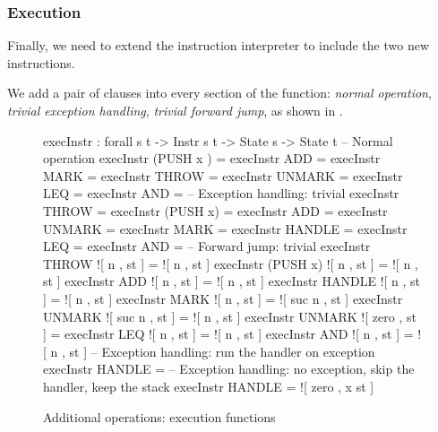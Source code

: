 \subsubsection{Execution}

Finally, we need to extend the instruction interpreter to include the two new
instructions.

We add a pair of clauses into every section of the function: \emph{normal
operation}, \emph{trivial exception handling}, \emph{trivial forward jump},
as shown in .

\begin{figure}
\begin{codei}
  execInstr : forall {s t} -> Instr s t -> State s -> State t
  -- Normal operation
  execInstr (PUSH  x ) \tick[         	st ] = \tick[ x \scons st ]
  execInstr  ADD        = \tick[ (x + y) \scons st ]
  execInstr  MARK      \tick[          	st ] = 
  execInstr  THROW     \tick[          	st ] = 
  execInstr  UNMARK     = \tick[ x \scons st ]
  execInstr  LEQ        = 
  execInstr  AND        = 
  -- Exception handling: trivial
  execInstr  THROW		\x[     n , st ] = \x[     n , st ]
  execInstr (PUSH x)	\x[     n , st ] = \x[     n , st ]
  execInstr  ADD		\x[     n , st ] = \x[     n , st ]
  execInstr  UNMARK		\x[     n , st ] = \x[     n , st ]
  execInstr  MARK		\x[     n , st ] = \x[ suc n , st ]
  execInstr  HANDLE		\x[ suc n , st ] = \x[     n , st ]
  execInstr  LEQ		\x[     n , st ] = \x[     n , st ]
  execInstr  AND		\x[     n , st ] = \x[     n , st ]
  -- Forward jump: trivial
  execInstr  THROW		![ n , st ] = ![ n , st ]
  execInstr (PUSH x)	![ n , st ] = ![ n , st ]
  execInstr  ADD		![ n , st ] = ![ n , st ]
  execInstr  HANDLE		![ n , st ] = ![ n , st ]
  execInstr  MARK		![     n , st ] = ![ suc n , st ]
  execInstr  UNMARK		![ suc n , st ] = ![     n , st ]
  execInstr  UNMARK		![ zero  , st ] = \tick[ st ]
  execInstr  LEQ		![ n , st ] = ![ n , st ]
  execInstr  AND		![ n , st ] = ![ n , st ]
  -- Exception handling: run the handler on exception
  execInstr  HANDLE		\x[ zero , st ] = \tick[ st ]
  -- Exception handling: no exception, skip the handler, keep the stack
  execInstr  HANDLE		 = ![ zero , x \scons st ]
\end{codei}
\caption{Additional operations: execution functions}
\label{fig:additional-execInstr}
\end{figure}

